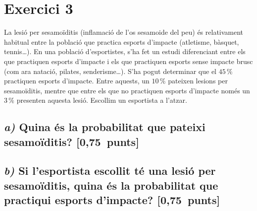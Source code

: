 \documentclass[11pt,a4paper]{article}
\begin{document}
\section*{\textcolor{blauPista}{Exercici 3}}

\noindent La lesió per sesamoïditis (inflamació de l'os sesamoide del peu) és relativament habitual entre la població que practica esports d'impacte (atletisme, bàsquet, tennis\ldots). En una població d'esportistes, s'ha fet un estudi diferenciant entre els que practiquen esports d'impacte i els que practiquen esports sense impacte brusc (com ara natació, pilates, senderisme\ldots). S'ha pogut determinar que el $45\,\%$ practiquen esports d'impacte. Entre aquests, un $10\,\%$ pateixen lesions per sesamoïditis, mentre que entre els que no practiquen esports d'impacte només un $3\,\%$ presenten aquesta lesió. Escollim un esportista a l'atzar.

\subsection*{\textit{a)} \normalfont Quina és la probabilitat que pateixi sesamoïditis? \hfill\textnormal{[0,75~punts]}}


\subsection*{\textit{b)} \normalfont Si l'esportista escollit té una lesió per sesamoïditis, quina és la probabilitat que practiqui esports d'impacte? \hfill\textnormal{[0,75~punts]}}

\end{document}
